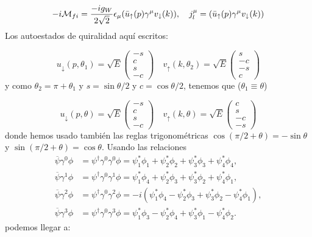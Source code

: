 \begin{equation}
	-i\Mcal_{fi} = \frac{-ig_W}{2\sqrt{2}} \epsilon_\mu  \pqty{ \bar{u}_\uparrow(p) \gamma^\mu v_\downarrow(k)}, \quad j_l^\mu = \pqty{ \bar{u}_\uparrow(p) \gamma^\mu v_\downarrow(k)}
\end{equation}
Los autoestados de quiralidad aquí escritos: 


\begin{equation}
	u_\downarrow(p,\theta_1)= \sqrt{E} \begin{pmatrix}
		-s \\ c \\ s \\ -c
	\end{pmatrix}\quad
	v_\uparrow(k,\theta_2) = \sqrt{E} \begin{pmatrix}
		s \\ -c \\ -s \\ c
	\end{pmatrix} 
\end{equation}
y como $\theta_2 = \pi + \theta_1$ y $s=\sin \theta/2$ y $c=\cos\theta/2$, tenemos que ($\theta_1 \equiv \theta$)

\begin{equation}
	u_\downarrow(p,\theta)= \sqrt{E} \begin{pmatrix}
		-s \\ c \\ s \\ -c
	\end{pmatrix}\quad
	v_\uparrow(k,\theta) = \sqrt{E} \begin{pmatrix}
		c \\ s \\ -c \\ -s
	\end{pmatrix} 
\end{equation}
donde hemos usado también las reglas trigonométricas $\cos (\pi/2 +\theta) = - \sin \theta$ y $\sin (\pi/2+\theta) = \cos \theta$. Usando las relaciones \cite{SaboridoSilva2025ParticlePhysicsI,thomson_modern_physics}
\begin{align}
	\overline{\psi}\gamma^0\phi & = \psi^\dagger \gamma^0 \gamma^0 \phi
	= \psi_1^*\phi_1 + \psi_2^*\phi_2 + \psi_3^*\phi_3 + \psi_4^*\phi_4,     \\
	\overline{\psi}\gamma^1\phi & = \psi^\dagger \gamma^0 \gamma^1 \phi
	= \psi_1^*\phi_4 + \psi_2^*\phi_3 + \psi_3^*\phi_2 + \psi_4^*\phi_1,     \\
	\overline{\psi}\gamma^2\phi & = \psi^\dagger \gamma^0 \gamma^2 \phi
	= -i(\psi_1^*\phi_4 - \psi_2^*\phi_3 + \psi_3^*\phi_2 - \psi_4^*\phi_1), \\
	\overline{\psi}\gamma^3\phi & = \psi^\dagger \gamma^0 \gamma^3 \phi
	= \psi_1^*\phi_3 - \psi_2^*\phi_4 + \psi_3^*\phi_1 - \psi_4^*\phi_2.
\end{align}
podemos llegar a: 

